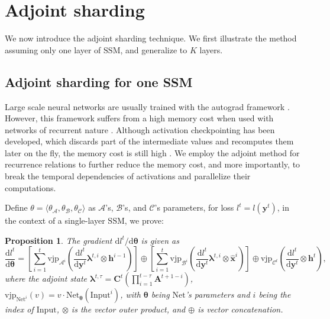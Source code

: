 \documentclass{article}
\newtheorem{proposition}{{\bf Proposition}}
\newcommand{\A}{\mathcal{A}}
\newcommand{\B}{\mathcal{B}}
\newcommand{\C}{\mathcal{C}}
\newcommand{\ssm}{\mathrm{SSM}}
\newcommand{\vjp}{\mathrm{vjp}}
\newcommand{\diff}{\mathrm{d}}
\newcommand{\blambda}{\boldsymbol{\lambda}}
\newcommand{\ka}[1]{{\color{brown} Kavosh: #1 }}
\begin{document}
\section{Adjoint sharding}
We now introduce the adjoint sharding technique. We first illustrate the method assuming only one layer of $\ssm$, and generalize to $K$ layers.
\subsection{Adjoint sharding for one SSM}
\label{sec:onessm}
Large scale neural networks are usually trained with the autograd framework \citep{baydin2018automaticdifferentiationmachinelearning, paszke2019pytorchimperativestylehighperformance}. However, this framework suffers from a high memory cost when used with networks of recurrent nature \citep{baydin2018automaticdifferentiationmachinelearning}. Although activation checkpointing has been developed, which discards part of the intermediate values and recomputes them later on the fly, the memory cost is still high \citep{herrmann2019optimalcheckpointingheterogeneouschains}.
We employ the adjoint method for recurrence relations to further reduce the memory cost, and more importantly, to break the temporal dependencies of activations and parallelize their computations.

Define $\theta = \langle \theta_{\boldsymbol{\A}}, \theta_{\boldsymbol{\B}}, \theta_{\boldsymbol{\C}}\rangle$ as $\boldsymbol{\A}$'s, $\boldsymbol{\B}$'s, and $\boldsymbol{\C}$'s parameters, for loss $l^t=l(\mathbf{y}^t)$, in the context of a single-layer $\ssm$, we prove:
\begin{proposition}
\label{prop:onessm}
    The gradient $\diff l^t/\diff \boldsymbol{\theta}$ is given as 
    \begin{equation}
    \frac{\diff l^t}{\diff\boldsymbol{\theta}} = \left[ \sum_{i=1}^{t}\vjp_{\boldsymbol{\A}^i}(\frac{\diff l^t}{\diff \mathbf{y}^t}\blambda^{t,i}\otimes \mathbf{h}^{i-1})\right ] \oplus \left [ \sum_{i=1}^{t}\vjp_{\boldsymbol{\B}^i}(\frac{\diff l^t}{\diff \mathbf{y}^t}\blambda^{t,i}\otimes \hat{\mathbf{x}}^i) \right ] \oplus \vjp_{\boldsymbol{\C}^t}(\frac{\diff l^t}{\diff \mathbf{y}^t}\otimes \mathbf{h}^t),
    \end{equation}
    where the adjoint state $\blambda^{t,\tau}=\mathbf{C}^t(\prod_{i=1}^{t-\tau}\mathbf{A}^{t+1-i})$, $\vjp_{\mathrm{Net}^i}(v)=v\cdot \mathrm{Net}_{\boldsymbol{\theta}}(\mathrm{Input}^i)$, with $\boldsymbol{\theta}$ being $\mathrm{Net}$'s parameters and $i$ being the index of $\mathrm{Input}$, $\otimes$ is the vector outer product, and $\oplus$ is vector concatenation.
\end{proposition}
\end{document}
